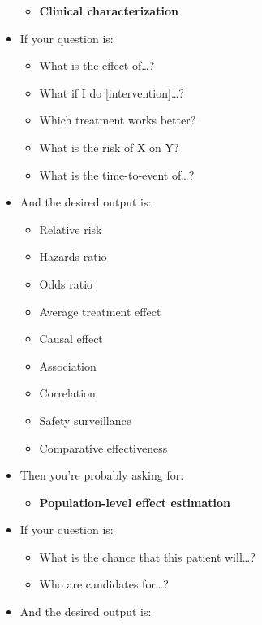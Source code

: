 \documentclass[11pt]{book}
\providecommand{\tightlist}{%
  \setlength{\itemsep}{0pt}\setlength{\parskip}{0pt}}
\theoremstyle{definition}
\theoremstyle{definition}
\theoremstyle{definition}
\theoremstyle{remark}
\begin{document}
\begin{itemize}
  \begin{itemize}
  \tightlist
  \item
    \textbf{Clinical characterization}
  \end{itemize}
\item
  If your question is:

  \begin{itemize}
  \tightlist
  \item
    What is the effect of\ldots?
  \item
    What if I do {[}intervention{]}\ldots?
  \item
    Which treatment works better?
  \item
    What is the risk of X on Y?
  \item
    What is the time-to-event of\ldots?
  \end{itemize}
\item
  And the desired output is:

  \begin{itemize}
  \tightlist
  \item
    Relative risk
  \item
    Hazards ratio
  \item
    Odds ratio
  \item
    Average treatment effect
  \item
    Causal effect
  \item
    Association
  \item
    Correlation
  \item
    Safety surveillance
  \item
    Comparative effectiveness
  \end{itemize}
\item
  Then you're probably asking for:

  \begin{itemize}
  \tightlist
  \item
    \textbf{Population-level effect estimation}
  \end{itemize}
\item
  If your question is:

  \begin{itemize}
  \tightlist
  \item
    What is the chance that this patient will\ldots?
  \item
    Who are candidates for\ldots?
  \end{itemize}
\item
  And the desired output is:


\end{itemize}
\end{document}

